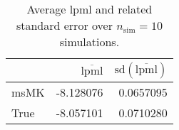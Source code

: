 \begin{table}[H]

\caption{Average lpml and related standard error over $n_{\text{sim}} = 10$ simulations.}
\centering
\begin{tabular}[t]{lrr}
\toprule
  & $\overbar{\text{lpml}}$ & $\text{sd}(\overbar{\text{lpml}})$\\
\midrule
msMK & -8.128076 & 0.0657095\\
True & -8.057101 & 0.0710280\\
\bottomrule
\end{tabular}
\end{table}